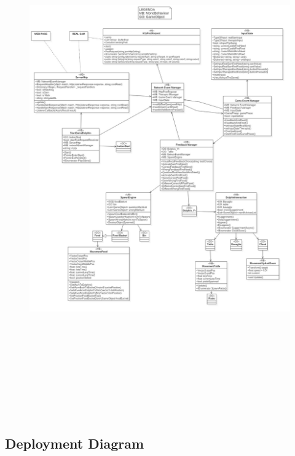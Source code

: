 \documentclass [12pt]{article}
\begin{document}
 \begin{figure}[ht!]
\centering
\includegraphics[height=22cm,width=16cm]{UML.jpg}
\end{figure}

\clearpage
\subsection{Deployment Diagram}
\end{document}
